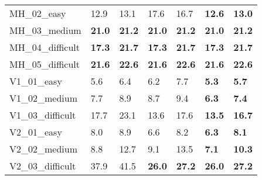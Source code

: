 \begin{table}[tb]
\begin{tabularx}{\columnwidth}{l *6{Y}}
             MH\_02\_easy & 12.9 & 13.1 & 17.6 & 16.7 & \textbf{{12.6}} & \textbf{{13.0}} \\
             MH\_03\_medium & \textbf{21.0} & \textbf{21.2} & \textbf{21.0} & \textbf{21.2} &\textbf{21.0} & \textbf{21.2} \\
             MH\_04\_difficult & \textbf{17.3} & \textbf{21.7} & \textbf{17.3} & \textbf{21.7} & \textbf{17.3} &  \textbf{21.7} \\
             MH\_05\_difficult & \textbf{21.6} & \textbf{22.6} & \textbf{21.6} & \textbf{22.6} & \textbf{21.6} &  \textbf{22.6} \\
             V1\_01\_easy & 5.6 & 6.4 & 6.2 & 7.7 & \textbf{{5.3}} & \textbf{{5.7}} \\
           V1\_02\_medium & 7.7 & 8.9 & 8.7 & 9.4 & \textbf{{6.3}} & \textbf{{7.4}} \\
        V1\_03\_difficult & 17.7 & 23.1 & 13.6 & 17.6 & \textbf{{13.5}} & \textbf{{16.7}} \\
             V2\_01\_easy & 8.0 & 8.9 & 6.6 & 8.2 & \textbf{{6.3}} & \textbf{{8.1}} \\
           V2\_02\_medium & 8.8 & 12.7 & 9.1 & 13.5 & \textbf{{7.1}} & \textbf{{10.3}} \\
           V2\_03\_difficult & 37.9 & 41.5 & \textbf{26.0} & \textbf{27.2} & \textbf{26.0} & \textbf{27.2} \\
    \bottomrule
  \end{tabularx}%
\end{table}

